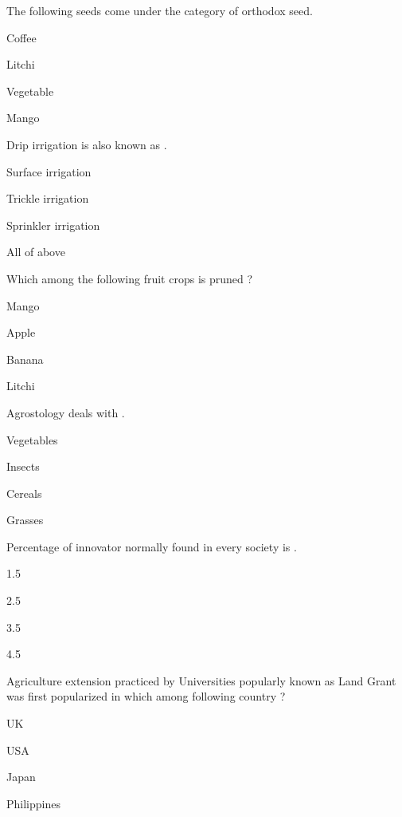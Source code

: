 \begin{questions}
\question The following seeds come under the category of orthodox seed.
\begin{items}
\item Coffee
\item Litchi
\item* Vegetable
\item Mango
\end{items}

\question Drip irrigation is also known as \fillin[][3cm].
\begin{items}
\item Surface irrigation
\item* Trickle irrigation
\item Sprinkler irrigation
\item All of above
\end{items}

\question Which among the following fruit crops is pruned ?
\begin{items}
\item Mango
\item* Apple
\item Banana
\item Litchi
\end{items}

\question Agrostology deals with \fillin[][3cm].
\begin{items}
\item Vegetables
\item Insects
\item Cereals
\item* Grasses
\end{items}

\question Percentage of innovator normally found in every society is \fillin[][3cm].
\begin{items}
\item 1.5
\item* 2.5
\item 3.5
\item 4.5
\end{items}

\question Agriculture extension practiced by Universities popularly known as Land Grant was first popularized in which among following country ?
\begin{items}
\item UK
\item* USA
\item Japan
\item Philippines
\end{items}


\end{questions}
